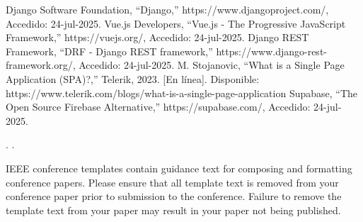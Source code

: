 \documentclass[conference]{IEEEtran}
\begin{document}
\begin{thebibliography}{00}
 Django Software Foundation, “Django,” https://www.djangoproject.com/, Accedido: 24-jul-2025.
 Vue.js Developers, “Vue.js - The Progressive JavaScript Framework,” https://vuejs.org/, Accedido: 24-jul-2025.
 Django REST Framework, “DRF - Django REST framework,” https://www.django-rest-framework.org/, Accedido: 24-jul-2025.
 M. Stojanovic, “What is a Single Page Application (SPA)?,” Telerik, 2023. [En línea]. Disponible: https://www.telerik.com/blogs/what-is-a-single-page-application
 Supabase, “The Open Source Firebase Alternative,” https://supabase.com/, Accedido: 24-jul-2025.

 .
 .
\end{thebibliography}
\vspace{12pt}
\color{red}
IEEE conference templates contain guidance text for composing and formatting conference papers. Please ensure that all template text is removed from your conference paper prior to submission to the conference. Failure to remove the template text from your paper may result in your paper not being published.
\end{document}
